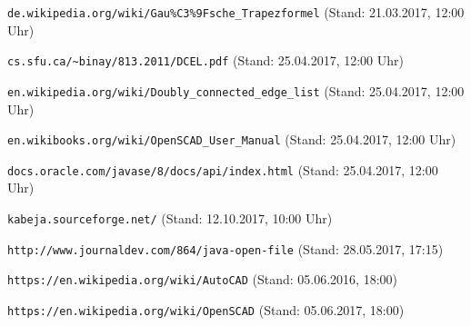 \begin{thebibliography}{9}
			\verb|de.wikipedia.org/wiki/Gau%C3%9Fsche_Trapezformel| (Stand: 21.03.2017, 12:00 Uhr)
		
		 \verb|cs.sfu.ca/~binay/813.2011/DCEL.pdf| (Stand: 25.04.2017, 12:00 Uhr)

		 \verb|en.wikipedia.org/wiki/Doubly_connected_edge_list| (Stand: 25.04.2017, 12:00 Uhr)
		
		 \verb|en.wikibooks.org/wiki/OpenSCAD_User_Manual| (Stand: 25.04.2017, 12:00 Uhr)
		
		 \verb|docs.oracle.com/javase/8/docs/api/index.html| (Stand: 25.04.2017, 12:00 Uhr)
		
		 \verb|kabeja.sourceforge.net/| (Stand: 12.10.2017, 10:00 Uhr)
		
		 \verb|http://www.journaldev.com/864/java-open-file| (Stand: 28.05.2017, 17:15)
		 
		 \verb|https://en.wikipedia.org/wiki/AutoCAD| (Stand: 05.06.2016, 18:00)
		 
		 \verb|https://en.wikipedia.org/wiki/OpenSCAD| (Stand: 05.06.2017, 18:00)
	
\end{thebibliography}